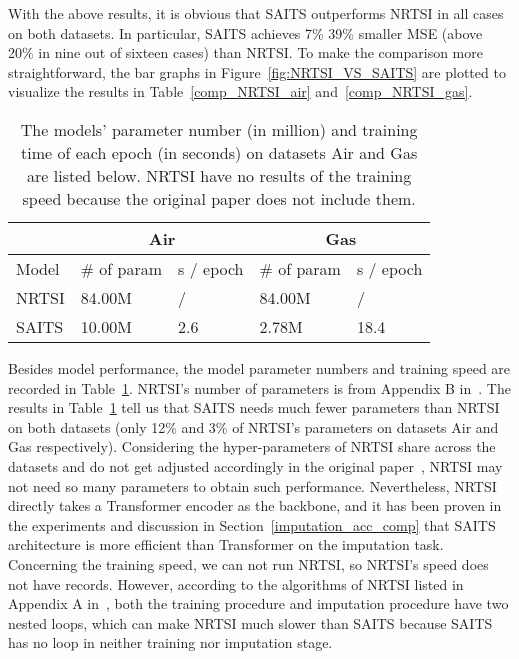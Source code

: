 \documentclass{article}
\begin{document}
With the above results, it is obvious that SAITS outperforms NRTSI in all cases on both datasets. In particular, SAITS achieves 7\%  39\% smaller MSE (above 20\% in nine out of sixteen cases) than NRTSI. To make the comparison more straightforward, the bar graphs in Figure~\ref{fig:NRTSI_VS_SAITS} are plotted to visualize the results in Table~\ref{comp_NRTSI_air} and~\ref{comp_NRTSI_gas}.

\begin{table}[!htb]
	\centering
	\caption{The models' parameter number (in million) and training time of each epoch (in seconds) on datasets Air and Gas are listed below. NRTSI have no results of the training speed because the original paper does not include them.}
	\label{tb:NRTSI_SAITS_param_speed}
	\begin{tabular}{p{50pt}<{\centering}|p{60pt}<{\centering}|p{60pt}<{\centering}|p{60pt}<{\centering}|p{60pt}<{\centering}}
		\toprule
		&   \multicolumn{2}{c|}{Air}	& \multicolumn{2}{c}{Gas}		\\
		\midrule
		Model         & \# of param   & s / epoch  & \# of param   & s / epoch  \\
		\midrule
		NRTSI         & 84.00M        &  /       &  84.00M       &   /       \\
		\midrule
		SAITS         & 10.00M        & 2.6      &  \phantom{0}2.78M   & 18.4 \\
		\bottomrule
	\end{tabular}
\end{table}

Besides model performance, the model parameter numbers and training speed are recorded in Table~\ref{tb:NRTSI_SAITS_param_speed}. NRTSI's number of parameters is from Appendix B in~\cite{Shan2021NRTSI}. The results in Table~\ref{tb:NRTSI_SAITS_param_speed} tell us that SAITS needs much fewer parameters than NRTSI on both datasets (only 12\% and 3\% of NRTSI's parameters on datasets Air and Gas respectively). Considering the hyper-parameters of NRTSI share across the datasets and do not get adjusted accordingly in the original paper~\cite{Shan2021NRTSI}, NRTSI may not need so many parameters to obtain such performance. Nevertheless, NRTSI directly takes a Transformer encoder as the backbone, and it has been proven in the experiments and discussion in Section~\ref{imputation_acc_comp} that SAITS architecture is more efficient than Transformer on the imputation task. Concerning the training speed, we can not run NRTSI, so NRTSI's speed does not have records. However, according to the algorithms of NRTSI listed in Appendix A in~\cite{Shan2021NRTSI}, both the training procedure and imputation procedure have two nested loops, which can make NRTSI much slower than SAITS because SAITS has no loop in neither training nor imputation stage.
\end{document}
